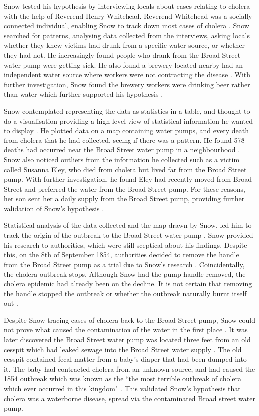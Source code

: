 \documentclass[12pt]{article}
\begin{document}
Snow tested his hypothesis by interviewing locals about cases relating to cholera with the help of Reverend Henry Whitehead. Reverend Whitehead was a socially connected individual, enabling Snow to track down most cases of cholera \cite{tedtalk}. Snow searched for patterns, analysing data collected from the interviews, asking locals whether they knew victims had drunk from a specific water source, or whether they had not. He increasingly found people who drank from the Broad Street water pump were getting sick. He also found a brewery located nearby had an independent water source where workers were not contracting the disease \cite{blog}. With further investigation, Snow found the brewery workers were drinking beer rather than water which further supported his hypothesis \cite{youtube}.

Snow contemplated representing the data as statistics in a table, and thought to do a visualisation providing a high level view of statistical information he wanted to display \cite{tedtalk}. He plotted data on a map containing water pumps, and every death from cholera that he had collected, seeing if there was a pattern. He found 578 deaths had occurred near the Broad Street water pump in a neighbourhood \cite{channel1}. Snow also noticed outliers from the information he collected such as a victim called Susanna Eley, who died from cholera but lived far from the Broad Street pump. With further investigation, he found Eley had recently moved from Broad Street and preferred the water from the Broad Street pump. For these reasons, her son sent her a daily supply from the Broad Street pump, providing further validation of Snow's hypothesis \cite{channel1}. 

Statistical analysis of the data collected and the map drawn by Snow, led him to track the origin of the outbreak to the Broad Street water pump \cite{test}.
Snow provided his research to authorities, which were still sceptical about his findings. Despite this, on the 8th of September 1854, authorities decided to remove the handle from the Broad Street pump as a trial due to Snow's research \cite{ucla, youtube}. Coincidentally, the cholera outbreak stops. Although Snow had the pump handle removed, the cholera epidemic had already been on the decline. It is not certain that removing the handle stopped the outbreak or whether the outbreak naturally burnt itself out \cite{original}.

Despite Snow tracing cases of cholera back to the Broad Street pump, Snow could not prove what caused the contamination of the water in the first place \cite{ucla}. It was later discovered the Broad Street water pump was located three feet from an old cesspit which had leaked sewage into the Broad Street water supply \cite{channel1, heros}. The old cesspit contained fecal matter from a baby's diaper that had been dumped into it. The baby had contracted cholera from an unknown source, and had caused the 1854 outbreak which was known as the ``the most terrible outbreak of cholera which ever occurred in this kingdom" \cite{ucla, heros, tedtalk, johnson}. This validated Snow's hypothesis that cholera was a waterborne disease, spread via the contaminated Broad street water pump. 
\end{document}
